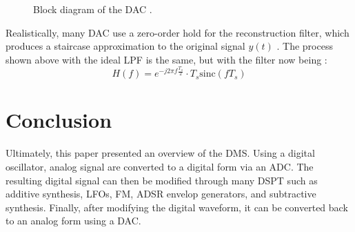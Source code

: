 \documentclass[12pt]{article}
\begin{document}
\begin{figure}[h!]
    \begin{center} %
    \end{center}
    \caption{Block diagram of the DAC \cite{SO}.}
    \label{fig:DAC}
\end{figure}

Realistically, many DAC use a zero-order hold for the reconstruction filter, which produces a staircase approximation to the original signal $y(t)$ \cite{SO}. The process shown above with the ideal LPF is the same, but with the filter now being \cite{FC}: 
\begin{equation}
    H(f) = e^{-j 2\pi f \frac{T_s}{2}} \cdot T_s \text{sinc}(fT_s)
\end{equation}

\section{Conclusion}
Ultimately, this paper presented an overview of the DMS. Using a digital oscillator, analog signal are converted to a digital form via an ADC. The resulting digital signal can then be modified through many DSPT such as additive synthesis, LFOs, FM, ADSR envelop generators, and subtractive synthesis. Finally, after modifying the digital waveform, it can be converted back to an analog form using a DAC.
\vspace{1em}
\end{document}
